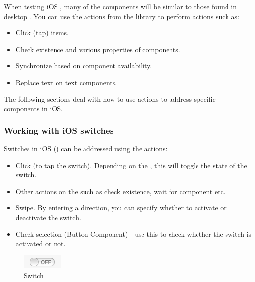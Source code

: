 When testing iOS \gdauts{}, many of the components will be similar to those found in desktop \gdauts{}. You can use the actions from the  library to perform actions such as:
\begin{itemize}
\item Click (tap) items.
\item Check existence and various properties of components.
\item Synchronize based on component availability.
\item Replace text on text components.
\end{itemize}

The following sections deal with how to use actions to address specific components in iOS. 

\subsubsection{Working with iOS switches}
Switches in iOS \gdauts{} () can be addressed using the actions:
\begin{itemize}
\item Click (to tap the switch). Depending on the \gdaut{}, this will toggle the state of the switch.
\item Other actions on the  such as check existence, wait for component etc.
\item Swipe. By entering a direction, you can specify whether to activate or deactivate the switch.
\item Check selection (Button Component) - use this to check whether the switch is activated or not.
\end{itemize}

 \begin{figure}[h]
\begin{center}
\includegraphics[width=2cm]{Toolkit/iOS/PS/Switch}
\caption{Switch}
\label{Switch}
\end{center}
\end{figure}

